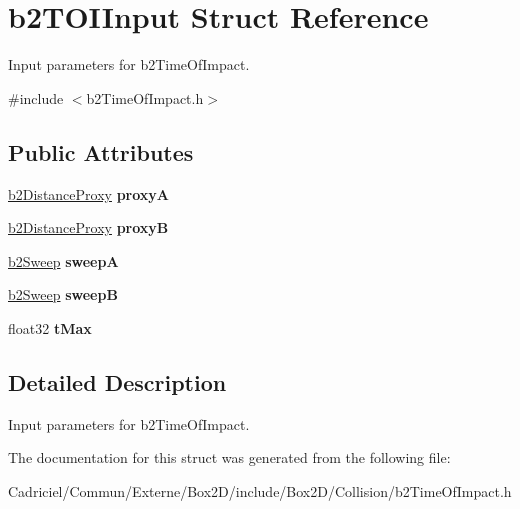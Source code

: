\hypertarget{structb2_t_o_i_input}{}\section{b2\+T\+O\+I\+Input Struct Reference}
\label{structb2_t_o_i_input}


Input parameters for b2\+Time\+Of\+Impact.  




{\ttfamily \#include $<$b2\+Time\+Of\+Impact.\+h$>$}

\subsection*{Public Attributes}
\begin{DoxyCompactItemize}
\item 
\hyperlink{structb2_distance_proxy}{b2\+Distance\+Proxy} {\bfseries proxyA}\hypertarget{structb2_t_o_i_input_a5c5fb931435d92ac2d2080552400cd57}{}\label{structb2_t_o_i_input_a5c5fb931435d92ac2d2080552400cd57}

\item 
\hyperlink{structb2_distance_proxy}{b2\+Distance\+Proxy} {\bfseries proxyB}\hypertarget{structb2_t_o_i_input_a7f4e614d1c574006402e9610c984a93f}{}\label{structb2_t_o_i_input_a7f4e614d1c574006402e9610c984a93f}

\item 
\hyperlink{structb2_sweep}{b2\+Sweep} {\bfseries sweepA}\hypertarget{structb2_t_o_i_input_adf63a4b9969aa839c2d520bf6d76148a}{}\label{structb2_t_o_i_input_adf63a4b9969aa839c2d520bf6d76148a}

\item 
\hyperlink{structb2_sweep}{b2\+Sweep} {\bfseries sweepB}\hypertarget{structb2_t_o_i_input_af506b6adc7eca852f08460ec76c7b9a7}{}\label{structb2_t_o_i_input_af506b6adc7eca852f08460ec76c7b9a7}

\item 
float32 {\bfseries t\+Max}\hypertarget{structb2_t_o_i_input_a365a434996de60957777a673918d3a5f}{}\label{structb2_t_o_i_input_a365a434996de60957777a673918d3a5f}

\end{DoxyCompactItemize}


\subsection{Detailed Description}
Input parameters for b2\+Time\+Of\+Impact. 

The documentation for this struct was generated from the following file\+:\begin{DoxyCompactItemize}
\item 
Cadriciel/\+Commun/\+Externe/\+Box2\+D/include/\+Box2\+D/\+Collision/b2\+Time\+Of\+Impact.\+h\end{DoxyCompactItemize}
